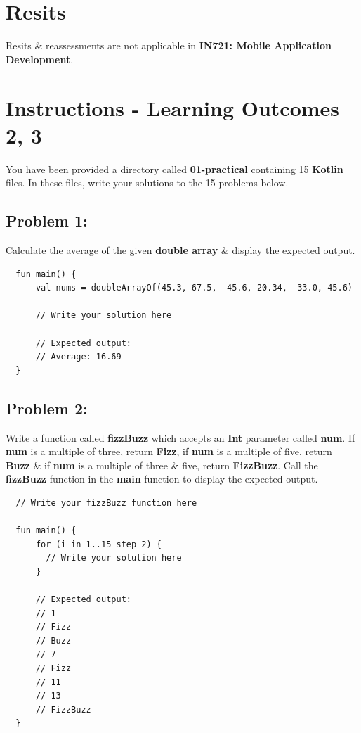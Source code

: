 \documentclass{article}
\begin{document}
\section*{Resits}
Resits \& reassessments are not applicable in \textbf{IN721: Mobile Application Development}.

\newpage

\section*{Instructions - Learning Outcomes 2, 3}
You have been provided a directory called \textbf{01-practical} containing 15 \textbf{Kotlin} files. In these files, write your solutions to the 15 problems below. 

\subsection*{Problem 1:} 
Calculate the average of the given \textbf{double array} \& display the expected output.

\begin{verbatim}
  fun main() {
      val nums = doubleArrayOf(45.3, 67.5, -45.6, 20.34, -33.0, 45.6)

      // Write your solution here

      // Expected output:
      // Average: 16.69 
  }
\end{verbatim}

\subsection*{Problem 2:}
Write a function called \textbf{fizzBuzz} which accepts an \textbf{Int} parameter called \textbf{num}. If \textbf{num} is a multiple of three, return \textbf{Fizz}, if \textbf{num} is a multiple of five, return \textbf{Buzz} \& if \textbf{num} is a multiple of three \& five, return \textbf{FizzBuzz}. Call the \textbf{fizzBuzz} function in the \textbf{main} function to display the expected output.

\begin{verbatim}
  // Write your fizzBuzz function here
  
  fun main() {
      for (i in 1..15 step 2) {
        // Write your solution here
      }

      // Expected output:
      // 1
      // Fizz
      // Buzz
      // 7
      // Fizz
      // 11
      // 13
      // FizzBuzz
  }
\end{verbatim}
\end{document}
